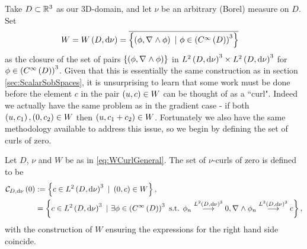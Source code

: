 Take $D\subset\mathbb{R}^3$ as our 3D-domain, and let $\nu$ be an arbitrary (Borel) measure on $D$.
Set 
\begin{align} \label{eq:WCurlGeneral}
	W &= W\left( D,\mathrm{d}\nu \right) = \overline{ \left\{  \left( \phi, \nabla_{}\wedge\phi \right) \ \vert \ \phi\in\left( C^{\infty}\left( D \right) \right)^3  \right\} }
\end{align}
as the closure of the set of pairs $\left\{ \left( \phi, \nabla_{}\wedge\phi \right) \right\}$ in $L^{2}\left( D,\mathrm{d}\nu \right)^3\times L^{2}\left( D,\mathrm{d}\nu \right)^3$ for $\phi\in\left( C^{\infty}\left( D \right) \right)^3$.
Given that this is essentially the same construction as in section \ref{sec:ScalarSobSpaces}, it is unsurprising to learn that some work must be done before the element $c$ in the pair $\left( u,c \right)\in W$ can be thought of as a ``curl".
Indeed we actually have the same problem as in the gradient case - if both $\left( u,c_1 \right), \left( 0, c_2 \right)\in W$ then $\left( u,c_1+c_2 \right)\in W$.
Fortunately we also have the same methodology available to address this issue, so we begin by defining the set of curls of zero.
\begin{definition} \label{def:CurlZeroGeneral}
	Let $D$, $\nu$ and $W$ be as in \eqref{eq:WCurlGeneral}.
	The set of $\nu$-curls of zero is defined to be
	\begin{align*}
		\curlZero{D}{\nu} &:= \clbracs{ c\in\ltwo{D}{\nu}^3 \ \vert \ \bracs{0,c}\in W }, \\
		&= \clbracs{ c\in\ltwo{D}{\nu}^3 \ \vert \ \exists\phi\in\bracs{\smooth{D}}^3 \text{ s.t. } \phi_n\lconv{\ltwo{D}{\nu}^3}0, \curl{}\phi_n\lconv{\ltwo{D}{\nu}^3}c },
	\end{align*}
	with the construction of $W$ ensuring the expressions for the right hand side coincide.
\end{definition}

